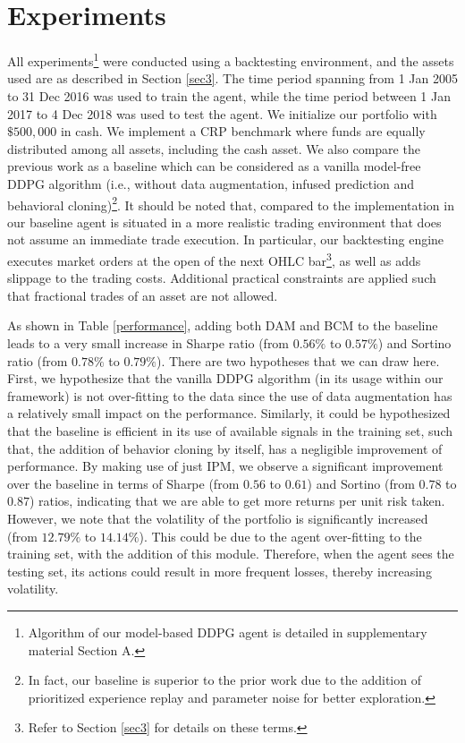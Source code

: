 \documentclass{article}
\begin{document}
\section{Experiments}\label{sec4}
All experiments\footnote{Algorithm of our model-based DDPG agent is detailed in supplementary material Section A.} were conducted using a backtesting environment, and the assets used are as described in Section \ref{sec3}. The time period spanning from 1 Jan 2005 to 31 Dec 2016 was used to train the agent, while the time period between 1 Jan 2017 to 4 Dec 2018 was used to test the agent. We initialize our portfolio with $\$500,000$ in cash. We implement a CRP benchmark where funds are equally distributed among all assets, including the cash asset. We also compare the previous work \cite{jiang2017deep} as a baseline which can be considered as a vanilla model-free DDPG algorithm (i.e., without data augmentation, infused prediction and behavioral cloning)\footnote{In fact, our baseline is superior to the prior work \cite{jiang2017deep} due to the addition of  prioritized experience replay and parameter noise for better exploration.}. It should be noted that, compared to the implementation in \cite{jiang2017deep} our baseline agent is situated in a more realistic trading environment that does not assume an immediate trade execution. In particular, our backtesting engine executes market orders at the open of the next OHLC bar\footnote{Refer to Section \ref{sec3} for details on these terms.}, as well as adds slippage to the trading costs. Additional practical constraints are applied such that fractional trades of an asset are not allowed.

As shown in Table \ref{performance}, adding both DAM and BCM to the baseline leads to a very small increase in Sharpe ratio (from $0.56\%$ to $0.57\%$) and Sortino ratio (from $0.78\%$ to $0.79\%$). There are two hypotheses that we can draw here. First, we hypothesize that the vanilla DDPG algorithm (in its usage within our framework) is not over-fitting to the data since the use of data augmentation has a relatively small impact on the performance. Similarly, it could be hypothesized that the baseline is efficient in its use of available signals in the training set, such that, the addition of behavior cloning by itself, has a negligible improvement of performance. 
By making use of just IPM, we observe a significant improvement over the baseline in terms of Sharpe (from $0.56$ to $0.61$) and Sortino (from $0.78$ to $0.87$) ratios, indicating that we are able to get more returns per unit risk taken. However, we note that the volatility of the portfolio is significantly increased (from $12.79\%$ to $14.14\%$). This could be due to the agent over-fitting to the training set, with the addition of this module. Therefore, when the agent sees the testing set, its actions could result in more frequent losses, thereby increasing volatility. 
\end{document}
